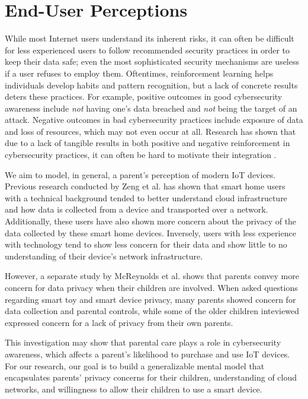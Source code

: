 \documentclass[12pt]{ucthesis}
\begin{document}
\section{End-User Perceptions}
While most Internet users understand its inherent risks, it can often be difficult for less experienced users to follow recommended security practices in order to keep their data safe; even the most sophisticated security mechanisms are useless if a user refuses to employ them. Oftentimes, reinforcement learning helps individuals develop habits and pattern recognition, but a lack of concrete results deters these practices. For example, positive outcomes in good cybersecurity awareness include \textit{not} having one's data breached and \textit{not} being the target of an attack. Negative outcomes in bad cybersecurity practices include exposure of data and loss of resources, which may not even occur at all. Research has shown that due to a lack of tangible results in both positive and negative reinforcement in cybersecurity practices, it can often be hard to motivate their integration \cite{west:psychology}.

We aim to model, in general, a parent's perception of modern IoT devices. Previous research conducted by Zeng et al. \cite{zeng:enduser} has shown that smart home users with a technical background tended to better understand cloud infrastructure and how data is collected from a device and transported over a network. Additionally, these users have also shown more concern about the privacy of the data collected by these smart home devices. Inversely, users with less experience with technology tend to show less concern for their data and show little to no understanding of their device's network infrastructure. 

However, a separate study by McReynolds et al. \cite{mcreynolds:toysthatlisten} shows that parents convey more concern for data privacy when their children are involved. When asked questions regarding smart toy and smart device privacy, many parents showed concern for data collection and parental controls, while some of the older children inteviewed expressed concern for a lack of privacy from their own parents.

This investigation may show that parental care plays a role in cybersecurity awareness, which affects a parent's likelihood to purchase and use IoT devices. For our research, our goal is to build a generalizable mental model that encapsulates parents' privacy concerns for their children, understanding of cloud networks, and willingness to allow their children to use a smart device. 
\end{document}
